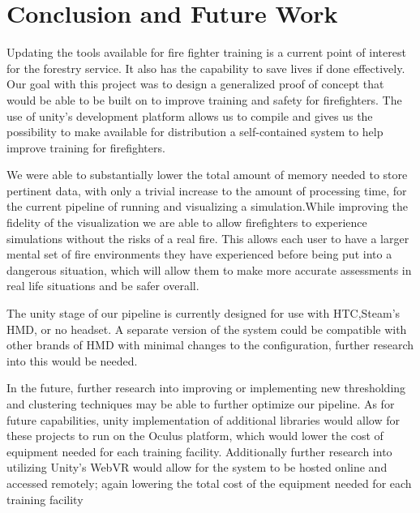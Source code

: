 
\chapter{Conclusion and Future Work} %

\label{Chapter4} %

Updating the tools available for fire fighter training is a current point of interest for the forestry service. It also has the capability to save lives if done effectively. Our goal with this project was to design a generalized proof of concept that would be able to be built on to improve training and safety for firefighters. The use of unity’s development platform allows us to compile and gives us the possibility to make available for distribution a self-contained system to help improve training for firefighters. \par
We were able to substantially lower the total amount of memory needed to store pertinent data, with only a trivial increase to the amount of processing time, for the current pipeline of running and visualizing a simulation.While  improving the fidelity of the visualization we are able to allow firefighters to experience simulations without the risks of a real fire. This allows  each user to have a larger mental set of fire environments they have experienced before being put into a dangerous situation, which will allow them to make more accurate assessments in real life situations and be safer overall. \par
The unity stage of our pipeline is currently designed for use with HTC,Steam’s HMD, or no headset. A separate version of the system could be compatible with other brands of HMD with minimal changes to the configuration, further research into this would be needed. \par
In the future, further research into improving or implementing new thresholding and clustering techniques may be able to further optimize our pipeline. As for future capabilities, unity implementation of additional libraries would allow for these projects to run on the Oculus platform, which would lower the cost of equipment needed for each training facility. Additionally further research into utilizing Unity’s WebVR would allow for the system to be hosted online and accessed remotely; again lowering the total cost of the equipment needed for each training facility


